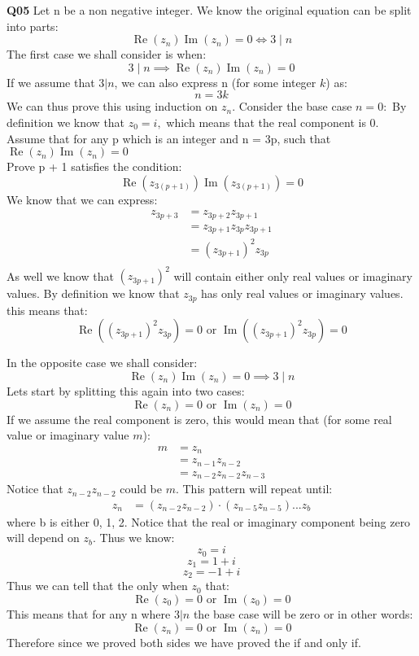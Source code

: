 \documentclass[11pt]{article}
\begin{document}
\parindent=0pt

\textbf{Q05} Let n be a non negative integer. We know the original equation can be split into parts:
\[  \operatorname{Re}(z_n)\operatorname{Im}(z_n) = 0 \iff 3 \mid n \]
The first case we shall consider is when:
\[  3 \mid n  \implies \operatorname{Re}(z_n)\operatorname{Im}(z_n) = 0 \]
If we assume that $3 | n$, we can also express n (for some integer $k$) as:
\[ n = 3k \]
We can thus prove this using induction on $z_n$. 
Consider the base case $n = 0:$ By definition we know that $z_0 = i, $ which means that the real component is 0. \\
Assume that for any p which is an integer and n = 3p, such that $\operatorname{Re}(z_n)\operatorname{Im}(z_n) = 0$\\
Prove p + 1 satisfies the condition:
\[ \operatorname{Re}(z_{3(p+1)})\operatorname{Im}(z_{3(p+1)}) = 0  \]
We know that we can express:
\begin{align*}
 z_{3p+3} & =  z_{3p+2}z_{3p+1} \\
& =  z_{3p+1}z_{3p}z_{3p+1} \\ 
& =  (z_{3p+1})^2z_{3p} \\ 
\end{align*}
As well we know that $(z_{3p+1})^2$ will contain either only real values or imaginary values. By definition we know that $z_{3p}$ has only real values or imaginary values. this means that:
\[ \operatorname{Re}((z_{3p+1})^2z_{3p}) = 0 \text{ or } \operatorname{Im}((z_{3p+1})^2z_{3p}) = 0 \]

In the opposite case we shall consider:
\[ \operatorname{Re}(z_n)\operatorname{Im}(z_n) = 0 \implies  3 \mid n  \]
Lets start by splitting this again into two cases:
\[  \operatorname{Re}(z_n) = 0 \text{ or } \operatorname{Im}(z_n)  = 0 \]
If we assume the real component is zero, this would mean that (for some real value or imaginary value $m$):
\begin{align*}
m & =  z_{n} \\
& =   z_{n-1} z_{n-2} \\ 
& =  z_{n-2} z_{n-2} z_{n-3} 
\end{align*}
Notice that $z_{n-2} z_{n-2}$ could be $m$. This pattern will repeat until:
\begin{align*}
z_{n} & =   (z_{n-2} z_{n-2})\cdot( z_{n-5} z_{n-5})... z_{b}
\end{align*}
where b is either 0, 1, 2. Notice that the real or imaginary component being zero will depend on $z_{b}$. Thus we know:
\[ z_0 = i \]
\[ z_1 = 1+ i \]
\[ z_2 = -1 + i \]
Thus we can tell that the only when $z_0$ that:
\[  \operatorname{Re}(z_0) = 0 \text{ or } \operatorname{Im}(z_0)  = 0 \]
This means that for any n where $3|n$ the base case will be zero or in other words:
\[  \operatorname{Re}(z_n) = 0 \text{ or } \operatorname{Im}(z_n)  = 0 \]
Therefore since we proved both sides we have proved the if and only if.
\end{document}
